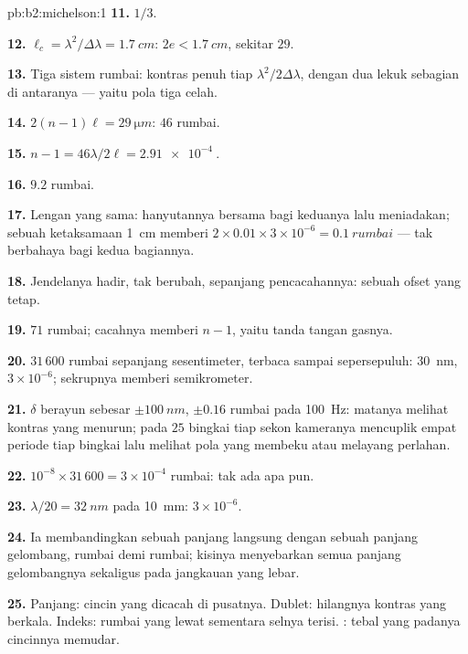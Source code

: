 \begin{solution}{pb:b2:michelson:1}
\textbf{11.} $1/3$.

\textbf{12.} $\ell_c = \lambda^2/\Delta\lambda = \qty{1.7}{cm}$: $2e < \qty{1.7}{cm}$, sekitar $29$.

\textbf{13.} Tiga sistem rumbai: kontras penuh tiap $\lambda^2/2\Delta\lambda$, dengan
dua lekuk sebagian di antaranya --- yaitu pola tiga celah.

\textbf{14.} $2(n - 1)\ell = \qty{29}{\micro m}$: $46$ rumbai.

\textbf{15.} $n - 1 = 46\lambda/2\ell = \qty{2.91e-4}{}$.

\textbf{16.} $9.2$ rumbai.

\textbf{17.} Lengan yang sama: hanyutannya bersama bagi keduanya lalu meniadakan; sebuah
ketaksamaan \qty{1}{cm} memberi $2 \times 0.01 \times 3 \times 10^{-6} = \qty{0.1}{rumbai}$ ---
tak berbahaya bagi kedua bagiannya.

\textbf{18.} Jendelanya hadir, tak berubah, sepanjang pencacahannya: sebuah
ofset yang tetap.

\textbf{19.} $71$ rumbai; cacahnya memberi $n - 1$, yaitu tanda tangan gasnya.

\textbf{20.} $31\,600$ rumbai sepanjang sesentimeter, terbaca sampai sepersepuluh:
\qty{30}{nm}, $3 \times 10^{-6}$; sekrupnya memberi semikrometer.

\textbf{21.} $\delta$ berayun sebesar $\pm\qty{100}{nm}$, $\pm0.16$ rumbai pada \qty{100}{Hz}:
matanya melihat kontras yang menurun; pada $25$ bingkai tiap sekon kameranya
mencuplik empat periode tiap bingkai lalu melihat pola yang membeku atau
melayang perlahan.

\textbf{22.} $10^{-8} \times 31\,600 = 3 \times 10^{-4}$ rumbai: tak ada apa pun.

\textbf{23.} $\lambda/20 = \qty{32}{nm}$ pada \qty{10}{mm}: $3 \times 10^{-6}$.

\textbf{24.} Ia membandingkan sebuah panjang langsung dengan sebuah panjang gelombang, rumbai demi
rumbai; kisinya menyebarkan semua panjang gelombangnya sekaligus pada jangkauan yang lebar.

\textbf{25.} Panjang: cincin yang dicacah di pusatnya. Dublet: hilangnya
kontras yang berkala. Indeks: rumbai yang lewat sementara selnya
terisi. : tebal yang padanya cincinnya memudar.
\end{solution}
